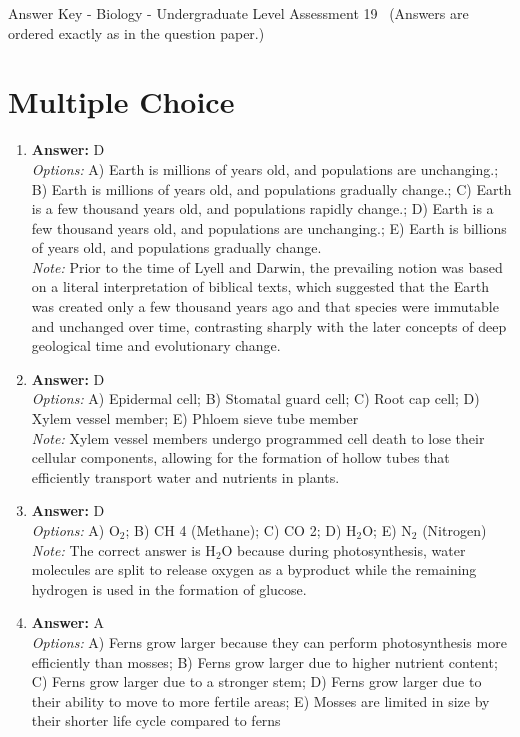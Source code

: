 \documentclass[12pt]{article}
\begin{document}
\begin{center}
Answer Key - Biology - Undergraduate Level Assessment 19 \
\small (Answers are ordered exactly as in the question paper.)
\end{center}

\section*{Multiple Choice}
\begin{enumerate}[label=\arabic*.]
\item \textbf{Answer:} D
\\ \textit{Options:} A) Earth is millions of years old, and populations are unchanging.; B) Earth is millions of years old, and populations gradually change.; C) Earth is a few thousand years old, and populations rapidly change.; D) Earth is a few thousand years old, and populations are unchanging.; E) Earth is billions of years old, and populations gradually change.
\\ \textit{Note:} Prior to the time of Lyell and Darwin, the prevailing notion was based on a literal interpretation of biblical texts, which suggested that the Earth was created only a few thousand years ago and that species were immutable and unchanged over time, contrasting sharply with the later concepts of deep geological time and evolutionary change.
\item \textbf{Answer:} D
\\ \textit{Options:} A) Epidermal cell; B) Stomatal guard cell; C) Root cap cell; D) Xylem vessel member; E) Phloem sieve tube member
\\ \textit{Note:} Xylem vessel members undergo programmed cell death to lose their cellular components, allowing for the formation of hollow tubes that efficiently transport water and nutrients in plants.
\item \textbf{Answer:} D
\\ \textit{Options:} A) O$_{2}$; B) CH 4 (Methane); C) CO 2; D) H$_{2}$O; E) N$_{2}$ (Nitrogen)
\\ \textit{Note:} The correct answer is H$_{2}$O because during photosynthesis, water molecules are split to release oxygen as a byproduct while the remaining hydrogen is used in the formation of glucose.
\item \textbf{Answer:} A
\\ \textit{Options:} A) Ferns grow larger because they can perform photosynthesis more efficiently than mosses; B) Ferns grow larger due to higher nutrient content; C) Ferns grow larger due to a stronger stem; D) Ferns grow larger due to their ability to move to more fertile areas; E) Mosses are limited in size by their shorter life cycle compared to ferns

\end{enumerate}
\end{document}
